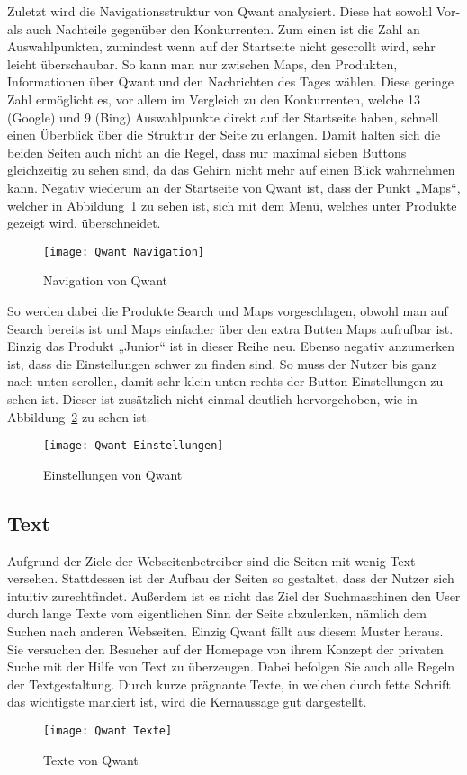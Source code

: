 Zuletzt wird die Navigationsstruktur von Qwant analysiert. Diese hat sowohl Vor- als auch Nachteile gegenüber den Konkurrenten.
Zum einen ist die Zahl an Auswahlpunkten, zumindest wenn auf der Startseite nicht gescrollt wird, sehr leicht überschaubar.
So kann man nur zwischen Maps, den Produkten, Informationen über Qwant und den Nachrichten des Tages wählen. Diese geringe
Zahl ermöglicht es, vor allem im Vergleich zu den Konkurrenten, welche 13 (Google) und 9 (Bing) Auswahlpunkte direkt auf der
Startseite haben, schnell einen Überblick über die Struktur der Seite zu erlangen. Damit halten sich die beiden Seiten auch
nicht an die Regel, dass nur maximal sieben Buttons gleichzeitig zu sehen sind, da das Gehirn nicht mehr auf einen Blick
wahrnehmen kann\autocite[Seite 16]{Maulhardt.20220621b}. Negativ wiederum an der Startseite von Qwant ist, dass der Punkt „Maps“, welcher
in Abbildung~\ref{fig:qwantnavigation} zu sehen ist, sich mit dem Menü, welches unter Produkte gezeigt wird, überschneidet.
\begin{figure}[h]
    \centering
    \texttt{[image: Qwant Navigation]}
    \caption{Navigation von Qwant}
    \label{fig:qwantnavigation}
\end{figure}

So werden dabei die
Produkte Search und Maps vorgeschlagen, obwohl man auf Search bereits ist und Maps einfacher über den extra Butten Maps
aufrufbar ist. Einzig das Produkt „Junior“ ist in dieser Reihe neu. Ebenso negativ anzumerken ist, dass die Einstellungen
schwer zu finden sind. So muss der Nutzer bis ganz nach unten scrollen, damit sehr klein unten rechts der Button Einstellungen
zu sehen ist. Dieser ist zusätzlich nicht einmal deutlich hervorgehoben, wie in Abbildung~\ref{fig:qwanteinstellungen} zu sehen ist.
\begin{figure}[h]
    \centering
    \texttt{[image: Qwant Einstellungen]}
    \caption{Einstellungen von Qwant}
    \label{fig:qwanteinstellungen}
\end{figure}

\subsection{Text}
Aufgrund der Ziele der Webseitenbetreiber sind die Seiten mit wenig Text versehen. Stattdessen ist der Aufbau der Seiten
so gestaltet, dass der Nutzer sich intuitiv zurechtfindet. Außerdem ist es nicht das Ziel der Suchmaschinen den User durch
lange Texte vom eigentlichen Sinn der Seite abzulenken, nämlich dem Suchen nach anderen Webseiten. Einzig Qwant fällt aus
diesem Muster heraus. Sie versuchen den Besucher auf der Homepage von ihrem Konzept der privaten Suche mit der Hilfe von
Text zu überzeugen. Dabei befolgen Sie auch alle Regeln der Textgestaltung\autocite[Seite 5ff]{Maulhardt.20220621b}. Durch kurze prägnante Texte,
in welchen durch fette Schrift das wichtigste markiert ist, wird die Kernaussage gut dargestellt.
\begin{figure}[h]
    \centering
    \texttt{[image: Qwant Texte]}
    \caption{Texte von Qwant}
\end{figure}

